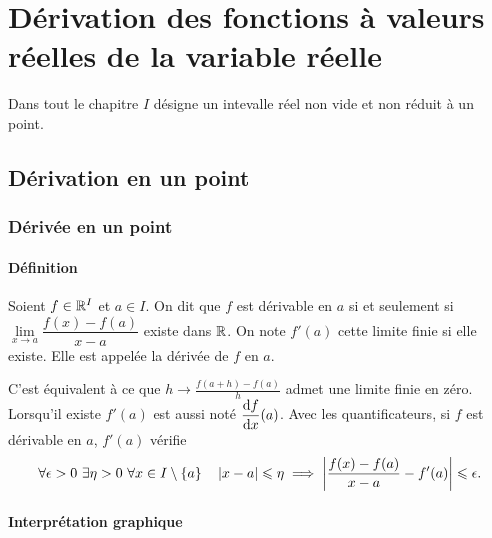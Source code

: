 \chapter[Dérivation des fonctions de la variable réelle]{Dérivation des fonctions à valeurs réelles de la variable réelle} 
\minitoc
\minilof
\minilot
Dans tout le chapitre \(I\) désigne un intevalle réel non vide et non réduit à un point.
\section{Dérivation en un point}
\subsection{Dérivée en un point}
\subsubsection{Définition}
\begin{defdef}
  Soient \(f \in \mathbb{R}^I\) et \(a \in I\). On dit que \(f\) est dérivable en \(a\) si et seulement si \(\lim\limits_{x \to a} \dfrac{f(x)-f(a)}{x-a}\) existe dans \(\mathbb{R}\). On note \(f'(a)\) cette limite finie si elle existe. Elle est appelée la dérivée de \(f\) en \(a\).
\end{defdef}
C'est équivalent à ce que \(h \longrightarrow \frac{f(a+h)-f(a)}{h}\) admet une limite finie en zéro. Lorsqu'il existe \(f'(a)\) est aussi noté \(\dfrac{\mathrm{d} f}{\mathrm{d} x}(a)\). Avec les quantificateurs, si \(f\) est dérivable en \(a\), \(f'(a)\) vérifie
\begin{equation}
  \forall \epsilon >0 \ \exists \eta > 0 \ \forall x \in I\setminus\{a\} \quad \left\lvert x-a\right\rvert \leqslant \eta \implies \left\lvert\frac{f(x)-f(a)}{x-a} - f'(a)\right\rvert \leqslant \epsilon.
\end{equation}

\subsubsection{Interprétation graphique}

